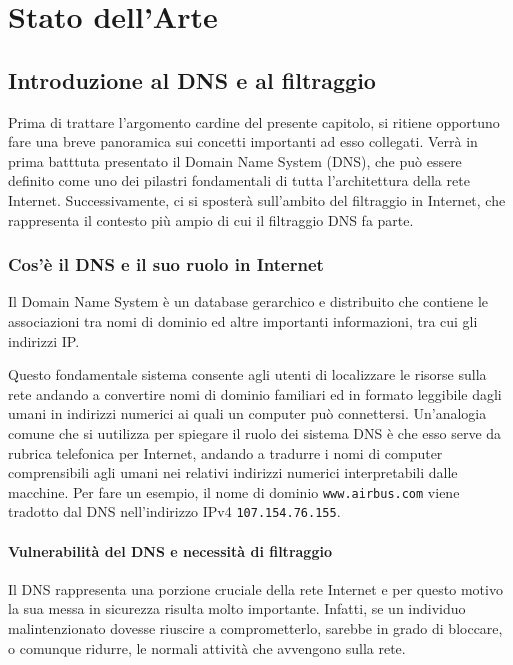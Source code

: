 \chapter{Stato dell'Arte}

\section{Introduzione al DNS e al filtraggio}
Prima di trattare l'argomento cardine del presente capitolo, si ritiene opportuno fare una breve panoramica sui concetti importanti ad esso collegati. Verrà in prima batttuta presentato il Domain Name System (DNS), che può essere definito come uno dei pilastri fondamentali di tutta l'architettura della rete Internet. Successivamente, ci si sposterà sull'ambito del filtraggio in Internet, che rappresenta il contesto più ampio di cui il filtraggio DNS fa parte.

\subsection{Cos'è il DNS e il suo ruolo in Internet}
Il Domain Name System è un database gerarchico e distribuito che contiene le associazioni tra nomi di dominio ed altre importanti informazioni, tra cui gli indirizzi IP.

Questo fondamentale sistema consente agli utenti di localizzare le risorse sulla rete andando a convertire nomi di dominio familiari ed in formato leggibile dagli umani in indirizzi numerici ai quali un computer può connettersi. Un'analogia comune che si uutilizza per spiegare il ruolo dei sistema DNS è che esso serve da rubrica telefonica per Internet, andando a tradurre i nomi di computer comprensibili agli umani nei relativi indirizzi numerici interpretabili dalle macchine. Per fare un esempio, il nome di dominio \texttt{www.airbus.com} viene tradotto dal DNS nell'indirizzo IPv4 \texttt{107.154.76.155}.

\subsubsection{Vulnerabilità del DNS e necessità di filtraggio}
Il DNS rappresenta una porzione cruciale della rete Internet e per questo motivo la sua messa in sicurezza risulta molto importante. Infatti, se un individuo malintenzionato dovesse riuscire a comprometterlo, sarebbe in grado di bloccare, o comunque ridurre, le normali attività che avvengono sulla rete.

